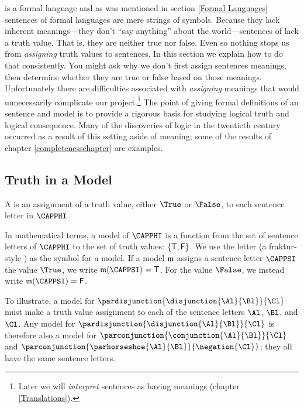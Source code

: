 \GSL{} is a formal language and as was mentioned in section \ref{Formal Languages} sentences of formal languages are mere strings of symbols.
Because they lack inherent meanings---they don't ``say anything'' about the world---sentences of \GSL{} lack a truth value. That is, they are neither true nor false. 
Even so nothing stops us from \emph{assigning} truth values to \GSL{} sentences. 
In this section we explain how to do that consistently. 
You might ask why we don't first assign \GSL{} sentences meanings, then determine whether they are true or false based on those meanings. 
Unfortunately there are difficulties associated with \emph{assigning} meanings that would unnecessarily complicate our project.\footnote{Later we will \emph{interpret} \GSL{} sentences as having meanings (chapter \ref{Translations}).} The point of giving formal definitions of an \GSL{} sentence and model is to provide a rigorous basis for studying logical truth and logical consequence.  Many of the discoveries of logic in the twentieth century occurred as a result of this setting aside of meaning; some of the results of chapter \ref{completenesschapter} are examples.

\subsection{Truth in a Model}\label{Truth in an Interpretation} 

\begin{majorILnc}{}
A  is an assignment of a truth value, either $\True$ or $\False$, to each sentence letter in $\CAPPHI$.
\end{majorILnc}

\noindent{}In mathematical terms, a model of $\CAPPHI$ is a function from the set of sentence letters of $\CAPPHI$ to the set of truth values: $\{\mathsf{T}, \mathsf{F}\}$. 
We use the letter \mention{$\IntA$} (a fraktur-style ) as the symbol for a model. 
If a model $\IntA$ assigns a sentence letter $\CAPPSI$ the value $\True$, we write $\IntA(\CAPPSI)=\TrueB$.
For the value $\False$, we instead write $\IntA(\CAPPSI)=\FalseB$.

To illustrate, a model for $\pardisjunction{\disjunction{\Al}{\Bl}}{\Cl}$ must make a truth value assignment to each of the sentence letters $\Al$, $\Bl$, and $\Cl$.  Any model for $\pardisjunction{\disjunction{\Al}{\Bl}}{\Cl}$ is therefore also a model for $\parconjunction{\conjunction{\Al}{\Bl}}{\Cl}$ and $\parconjunction{\parhorseshoe{\Al}{\Bl}}{\negation{\Cl}}$; they all have the same sentence letters.

